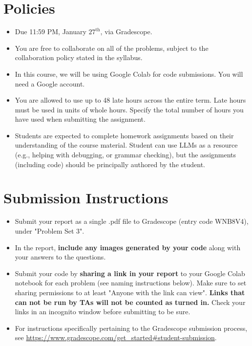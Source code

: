\documentclass{article}
\begin{document}
\pagestyle{fancy}




\section*{Policies}
\begin{itemize}
	\item Due 11:59 PM, January $27^\text{th}$, via Gradescope.
	\item You are free to collaborate on all of the problems, subject to the collaboration policy stated in the syllabus.
	\item In this course, we will be using Google Colab for code submissions. You will need a Google account.
	\item You are allowed to use up to 48 late hours across the entire term. Late hours must be used in units of whole hours. Specify the total number of hours you have used when submitting the assignment.
	\item Students are expected to complete homework assignments based on their understanding of the course material. Student can use LLMs as a resource (e.g., helping with debugging, or grammar checking), but the assignments (including code) should be principally authored by the student.
\end{itemize}

\section*{Submission Instructions}
\begin{itemize}
	\item Submit your report as a single .pdf file to Gradescope (entry code WNB8V4), under "Problem Set 3".
	\item In the report, \textbf{include any images generated by your code} along with your answers to the questions.
	\item Submit your code by \textbf{sharing a link in your report} to your Google Colab notebook for each problem (see naming instructions below). Make sure to set sharing permissions to at least "Anyone with the link can view". \textbf{Links that can not be run by TAs will not be counted as turned in.} Check your links in an incognito window before submitting to be sure.
	\item For instructions specifically pertaining to the Gradescope submission process, see \url{https://www.gradescope.com/get_started#student-submission}.
\end{itemize}
\end{document}
